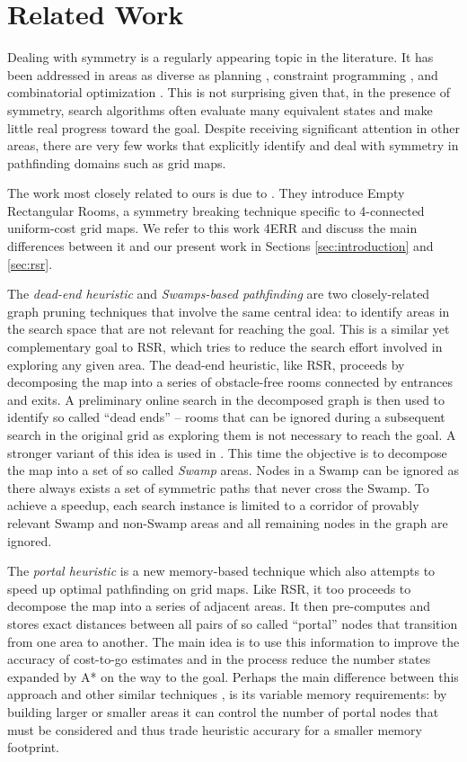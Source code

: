 \section{Related Work}
\label{sec:relatedwork}
Dealing with symmetry is a regularly appearing topic in the literature.  It has
been addressed in areas as diverse as planning \cite{fox99}, constraint programming
\cite{gent00}, and combinatorial optimization \cite{fukunaga08}.  This is not
surprising given that, in the presence of symmetry, search algorithms often
evaluate many equivalent states and make little real progress toward the goal.
Despite receiving significant attention in other areas, there are very few
works that explicitly identify and deal with symmetry in pathfinding domains 
such as grid maps. 
\par
The work most closely related to ours is due to \cite{harabor10}.  They
introduce Empty Rectangular Rooms, a symmetry breaking technique specific to
4-connected uniform-cost grid maps.  We refer to this work 4ERR and discuss the
main differences between it and our present work in Sections
\ref{sec:introduction} and \ref{sec:rsr}.
\par
The \emph{dead-end heuristic} \cite{bjornsson06} and \emph{Swamps-based
pathfinding} \cite{pochter10} are two closely-related graph pruning techniques
that involve the same central idea: to identify areas in the search space that
are not relevant for reaching the goal. This is a similar yet complementary goal
to RSR, which tries to reduce the search effort involved in exploring any given
area.  The dead-end heuristic, like RSR, proceeds by decomposing the map into a
series of obstacle-free rooms connected by entrances and exits.  A preliminary
online search in the decomposed graph is then used to identify so called ``dead
ends'' -- rooms that can be ignored during a subsequent search in the original
grid as exploring them is not necessary to reach the goal.  A stronger variant
of this idea is used in \cite{pochter10}.
This time the objective is to decompose the map into a set of so 
called \emph{Swamp} areas. Nodes in a Swamp can be ignored as there always
exists a set of symmetric paths that never cross the Swamp.  To achieve a
speedup, each search instance is limited to a corridor of provably relevant
Swamp and non-Swamp areas and all remaining nodes in the graph are ignored.
\par
The \emph{portal heuristic} \cite{goldenberg10} is a new memory-based technique
which also attempts to speed up optimal pathfinding on grid maps.  Like RSR, it
too proceeds to decompose the map into a series of adjacent areas.  It then
pre-computes and stores exact distances between all pairs of so called
``portal'' nodes that transition from one area to another. The main idea is to
use this information to improve the accuracy of cost-to-go estimates and in the
process reduce the number states expanded by A* on the way to the goal.  Perhaps
the main difference between this approach and other similar techniques
\cite{sturtevant09,felner09,bjornsson09}, is its variable memory requirements:
by building larger or smaller areas it can control the number of portal nodes
that must be considered and thus trade heuristic accurary for a smaller memory
footprint.
